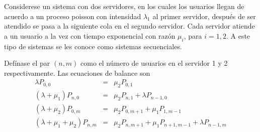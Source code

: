 \documentclass{article}
\numberwithin{equation}{section}
\begin{document}
Considerese un sistema con dos servidores, en los cuales los usuarios llegan de acuerdo a un proceso poisson con intensidad $\lambda_{1}$ al primer servidor, despu\'es de ser atendido se pasa a la siguiente cola en el segundo servidor. Cada servidor atiende a un usuario a la vez con tiempo exponencial con raz\'on $\mu_{i}$, para $i=1,2$. A este tipo de sistemas se les conoce como sistemas secuenciales.

Def\'inase el par $\left(n,m\right)$ como el n\'umero de usuarios en el servidor 1 y 2 respectivamente. Las ecuaciones de balance son
\begin{eqnarray}\label{Eq.Balance}
\lambda P_{0,0}&=&\mu_{2}P_{0,1}\\
\left(\lambda+\mu_{1}\right)P_{n,0}&=&\mu_{2}P_{n,1}+\lambda P_{n-1,0}\\
\left(\lambda+\mu_{2}\right)P_{0,m}&=&\mu_{2}P_{0,m+1}+\mu_{1}P_{1,m-1}\\
\left(\lambda+\mu_{1}+\mu_{2}\right)P_{n,m}&=&\mu_{2}P_{n,m+1}+\mu_{1}P_{n+1,m-1}+\lambda
P_{n-1,m}
\end{eqnarray}
\end{document}

